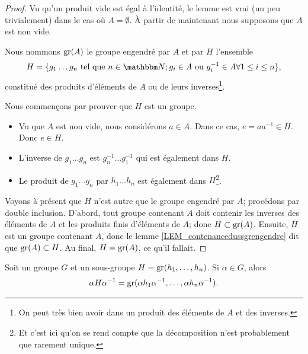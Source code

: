 \begin{proof}
    Vu qu'un produit vide est égal à l'identité, le lemme est vrai (un peu trivialement) dans le cas où \( A=\emptyset\). À partir de maintenant nous supposons que \( A\) est non vide.

    Nous nommons \( \operatorname{gr}(A)\) le groupe engendré par \( A\) et par \( H\) l'ensemble
    \begin{equation}
        H=\{ g_1\ldots g_n\tq n \in \eN;  g_i\in A \text{ ou } g_i^{-1} \in A \forall 1 \leq i \leq n\},
    \end{equation}
    constitué des produits d'éléments de \( A \) ou de leurs inverses\footnote{On peut très bien avoir dans un produit des éléments de $A$ et des inverses.}.
    
    Nous commençons par prouver que \( H\) est un groupe.
    \begin{itemize}
        \item Vu que \( A\) est non vide, nous considérons \( a\in A\). Dans ce cas, \( e=aa^{-1}\in H\). Donc \( e\in H\).
        \item L'inverse de \( g_1\ldots g_n\) est \( g_n^{-1}\ldots g_1^{-1}\) qui est également dans \( H\).
        \item Le produit de \( g_1\ldots g_n\) par \( h_1\ldots h_n\) est également dans \( H\)\footnote{Et c'est ici qu'on se rend compte que la décomposition n'est probablement que rarement unique.}.
    \end{itemize}
    
    Voyons à présent que \( H \) n'est autre que le groupe engendré par \( A \); procédons par double inclusion. D'abord, tout groupe contenant \( A\) doit contenir les inverses des éléments de \( A \) et les produits finis d'éléments de \( A \); donc \( H\subset \operatorname{gr}(A)\). Ensuite, \( H\) est un groupe contenant \( A\), donc le lemme \ref{LEM_contenancedussgrengendre} dit que \( \operatorname{gr}(A)\subset H\). Au final, \( H=\operatorname{gr}(A)\), ce qu'il fallait.
\end{proof}

\begin{lemma}       \label{LEMooCFTVooKvmyKN}
    Soit un groupe \( G\) et un sous-groupe \( H=\operatorname{gr}(h_1,\ldots, h_n)\). Si \( \alpha\in G\), alors
    \begin{equation}
        \alpha H\alpha^{-1}=\operatorname{gr}(\alpha h_1\alpha^{-1},\ldots, \alpha h_n\alpha^{-1}).
    \end{equation}
\end{lemma}

